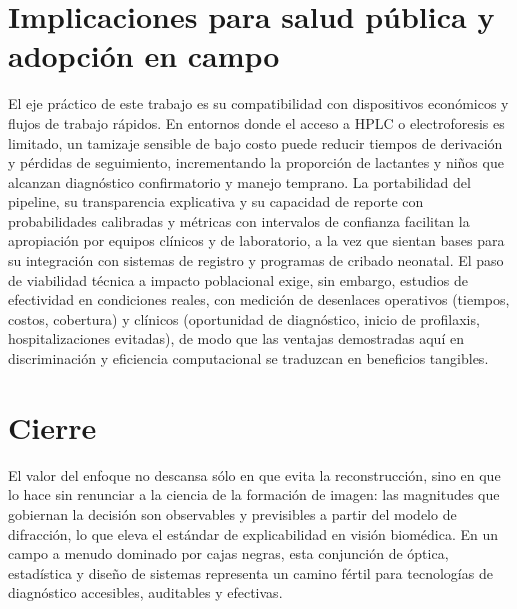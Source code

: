 \section*{Implicaciones para salud pública y adopción en campo}
El eje práctico de este trabajo es su compatibilidad con dispositivos económicos y flujos de trabajo rápidos. En entornos donde el acceso a HPLC o electroforesis es limitado, un tamizaje sensible de bajo costo puede reducir tiempos de derivación y pérdidas de seguimiento, incrementando la proporción de lactantes y niños que alcanzan diagnóstico confirmatorio y manejo temprano. La portabilidad del pipeline, su transparencia explicativa y su capacidad de reporte con probabilidades calibradas y métricas con intervalos de confianza facilitan la apropiación por equipos clínicos y de laboratorio, a la vez que sientan bases para su integración con sistemas de registro y programas de cribado neonatal. El paso de viabilidad técnica a impacto poblacional exige, sin embargo, estudios de efectividad en condiciones reales, con medición de desenlaces operativos (tiempos, costos, cobertura) y clínicos (oportunidad de diagnóstico, inicio de profilaxis, hospitalizaciones evitadas), de modo que las ventajas demostradas aquí en discriminación y eficiencia computacional se traduzcan en beneficios tangibles.

\section*{Cierre}
El valor del enfoque no descansa sólo en que evita la reconstrucción, sino en que lo hace sin renunciar a la ciencia de la formación de imagen: las magnitudes que gobiernan la decisión son observables y previsibles a partir del modelo de difracción, lo que eleva el estándar de explicabilidad en visión biomédica. En un campo a menudo dominado por cajas negras, esta conjunción de óptica, estadística y diseño de sistemas representa un camino fértil para tecnologías de diagnóstico accesibles, auditables y efectivas.

